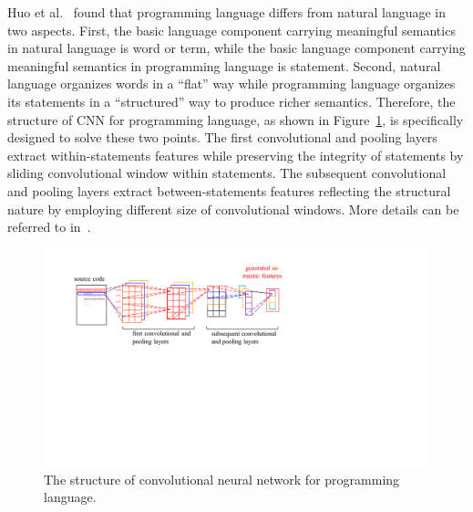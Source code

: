 Huo et al.~\cite{huo2016learning} found that programming language%
differs from natural language in two aspects. First, the basic language component carrying meaningful semantics in natural language is word or term, while the basic language component carrying meaningful semantics in programming language is statement. Second, natural language organizes words in a ``flat'' way while programming language organizes its statements in a ``structured'' way to produce richer semantics. Therefore, the structure of CNN for programming language, as shown in Figure~\ref{fig:npcnn}, is specifically designed to solve these two points. The first convolutional and pooling layers extract within-statements features while preserving the integrity of statements by sliding convolutional window within statements. The subsequent convolutional and pooling layers extract between-statements features reflecting the structural nature by employing different size of convolutional windows. More details can be referred to in~\cite{huo2016learning}.

\begin{figure}[hbt]
\centering
\includegraphics[width = \columnwidth]{pic/NPCNN.pdf}
\caption{The structure of convolutional neural network for programming language.}
\label{fig:npcnn}
\end{figure}

